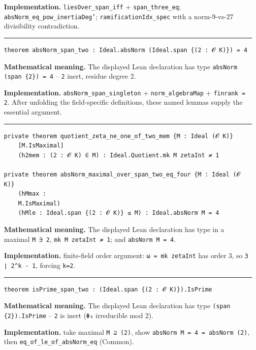 \documentclass[UTF8,a4paper,11pt,fontset=fandol]{ctexart}
\theoremstyle{definition}
\newcommand{\statementsep}{\par\medskip\hrule\medskip}
\begin{document}
\noindent\textbf{Implementation.} \texttt{liesOver\_\allowbreak{}span\_\allowbreak{}iff} + \texttt{span\_\allowbreak{}three\_\allowbreak{}eq}; \texttt{absNorm\_\allowbreak{}eq\_\allowbreak{}pow\_\allowbreak{}inertiaDeg'}; \texttt{ramificationIdx\_\allowbreak{}spec} with a norm-9-vs-27 divisibility contradiction.\par
\statementsep
\begin{verbatim}
theorem absNorm_span_two : Ideal.absNorm (Ideal.span {(2 : 𝓞 K)}) = 4
\end{verbatim}
\noindent\textbf{Mathematical meaning.} The displayed Lean declaration has type \texttt{absNorm (span \{2\}) = 4} -- \texttt{2} inert, residue degree 2.\par
\noindent\textbf{Implementation.} \texttt{absNorm\_\allowbreak{}span\_\allowbreak{}singleton} + \texttt{norm\_\allowbreak{}algebraMap} + \texttt{finrank = 2}. After unfolding the field-specific definitions, these named lemmas supply the essential argument.\par
\statementsep
\begin{verbatim}
private theorem quotient_zeta_ne_one_of_two_mem {M : Ideal (𝓞 K)}
    [M.IsMaximal]
    (h2mem : (2 : 𝓞 K) ∈ M) : Ideal.Quotient.mk M zetaInt ≠ 1

private theorem absNorm_maximal_over_span_two_eq_four {M : Ideal (𝓞 K)}
    (hMmax :
    M.IsMaximal)
    (hMle : Ideal.span {(2 : 𝓞 K)} ≤ M) : Ideal.absNorm M = 4
\end{verbatim}
\noindent\textbf{Mathematical meaning.} The displayed Lean declaration has type in a maximal \texttt{M ∋ 2}, \texttt{mk M zetaInt ≠ 1}; and \texttt{absNorm M = 4}.\par
\noindent\textbf{Implementation.} finite-field order argument: \texttt{ω = mk zetaInt} has order 3, so \texttt{3 ∣ 2\textasciicircum{}k - 1}, forcing \texttt{k=2}.\par
\statementsep
\begin{verbatim}
theorem isPrime_span_two : (Ideal.span {(2 : 𝓞 K)}).IsPrime
\end{verbatim}
\noindent\textbf{Mathematical meaning.} The displayed Lean declaration has type \texttt{(span \{2\}).\allowbreak{}IsPrime} -- \texttt{2} is inert (\texttt{Φ₃} irreducible mod 2).\par
\noindent\textbf{Implementation.} take maximal \texttt{M ⊇ (2)}, show \texttt{absNorm M = 4 = absNorm (2)}, then \texttt{eq\_\allowbreak{}of\_\allowbreak{}le\_\allowbreak{}of\_\allowbreak{}absNorm\_\allowbreak{}eq} (Common).\par
\end{document}
